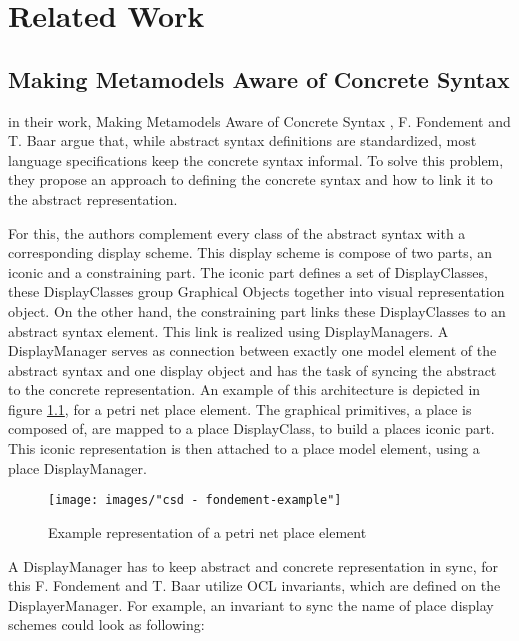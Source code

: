 \chapter{Related Work}
\label{sec:related_work}



\section{Making Metamodels Aware of Concrete Syntax}
\label{sec:fondement}
in their work, Making Metamodels Aware of Concrete Syntax \cite{fondement_making_2005}, F. Fondement and T. Baar argue that, while abstract syntax definitions are standardized, most language specifications keep the concrete syntax informal. To solve this problem, they propose an approach to defining the concrete syntax and how to link it to the abstract representation.

For this, the authors complement every class of the abstract syntax with a corresponding display scheme. This display scheme is compose of two parts, an iconic and a constraining part. The iconic part defines a set of DisplayClasses, these DisplayClasses group Graphical Objects together into visual representation object. On the other hand, the constraining part links these DisplayClasses to an abstract syntax element. This link is realized using DisplayManagers. A DisplayManager serves as connection between exactly one model element of the abstract syntax and one display object and has the task of syncing the abstract to the concrete representation. An example of this architecture is depicted in figure \ref{fig:fondement_dm}, for a petri net place element. The graphical primitives, a place is composed of, are mapped to a place DisplayClass, to build a places iconic part. This iconic representation is then attached to a place model element, using a place DisplayManager.


\begin{figure}[H]
  \centering
  \texttt{[image: images/"csd - fondement-example"]}
  \caption{Example representation of a petri net place element}
  \label{fig:fondement_dm}
\end{figure}

A DisplayManager has to keep abstract and concrete representation in sync, for this F. Fondement and T. Baar utilize OCL invariants, which are defined on the DisplayerManager. For example, an invariant to sync the name of place display schemes could look as following:


